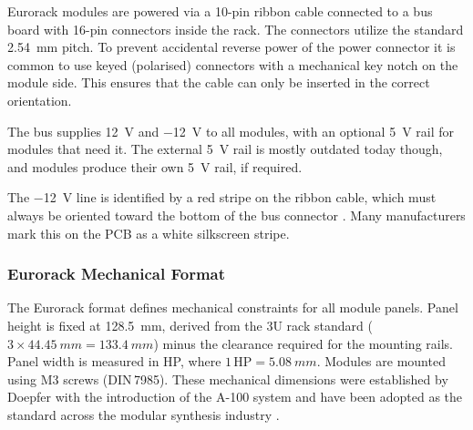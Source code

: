 Eurorack modules are powered via a 10-pin ribbon cable connected to a bus board with 16-pin connectors inside the rack. 
The connectors utilize the standard \qty{2.54}{mm} pitch. 
To prevent accidental reverse power of the power connector it is common to use keyed (polarised) connectors with a mechanical key notch on the module side. 
This ensures that the cable can only be inserted in the correct orientation.

The bus supplies \qty{+12}{V} and \qty{-12}{V} to all modules, with an optional \qty{+5}{V} rail for modules that need it.
The external \qty{5}{V} rail is mostly outdated today though, and modules produce their own \qty{5}{V} rail, if required.

The \qty{-12}{V} line is identified by a red stripe on the ribbon cable, which must always be oriented toward the bottom of the bus connector \cite{TechnicalDetailsA100}.
Many manufacturers mark this on the PCB as a white silkscreen stripe. 

\subsubsection{Eurorack Mechanical Format}


The Eurorack format defines mechanical constraints for all module panels.
Panel height is fixed at \qty{128.5}{mm}, derived from the 3U rack standard ($3 \times \qty{44.45}{mm} = \qty{133.4}{mm}$) minus the clearance required for the mounting rails. 
Panel width is measured in \ac{HP}, where $1\,\text{HP} = \qty{5.08}{mm}$. 
Modules are mounted using M3 screws (DIN\,7985). 
These mechanical dimensions were established by Doepfer with the introduction of the A-100 system and have been adopted as the standard across the modular synthesis industry \cite{ConstructionDetailsA100}.